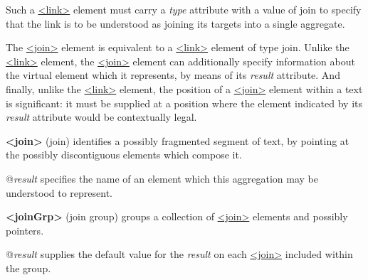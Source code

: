 Such a \hyperref[TEI.link]{<link>} element must carry a {\itshape type} attribute with a value of join to specify that the link is to be understood as joining its targets into a single aggregate.\par
The \hyperref[TEI.join]{<join>} element is equivalent to a \hyperref[TEI.link]{<link>} element of type join.  Unlike the \hyperref[TEI.link]{<link>} element, the \hyperref[TEI.join]{<join>} element can additionally specify information about the virtual element which it represents, by means of its {\itshape result} attribute. And finally, unlike the \hyperref[TEI.link]{<link>} element, the position of a \hyperref[TEI.join]{<join>} element within a text is significant: it must be supplied at a position where the element indicated by its {\itshape result} attribute would be contextually legal. 
\begin{sansreflist}
  
\item [\textbf{<join>}] (join) identifies a possibly fragmented segment of text, by pointing at the possibly discontiguous elements which compose it.\hfil\\[-10pt]\begin{sansreflist}
    \item[@{\itshape result}]
  specifies the name of an element which this aggregation may be understood to represent.
\end{sansreflist}  
\item [\textbf{<joinGrp>}] (join group) groups a collection of \hyperref[TEI.join]{<join>} elements and possibly pointers.\hfil\\[-10pt]\begin{sansreflist}
    \item[@{\itshape result}]
  supplies the default value for the {\itshape result} on each \hyperref[TEI.join]{<join>} included within the group.
\end{sansreflist}  
\end{sansreflist}

